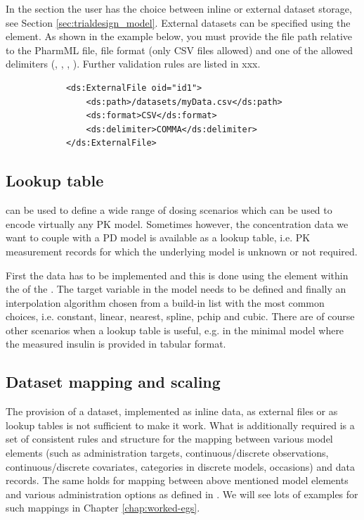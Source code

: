 In the  section the user has the choice between inline or
external dataset storage, see Section \ref{sec:trialdesign_model}.
External datasets can be specified using the  element. 
As shown in the example below, you must provide the file path relative to the PharmML file, 
file format (only CSV files allowed) and one of the allowed delimiters (, 
, , ). Further validation rules are listed in xxx.

\lstset{language=XML}
\begin{lstlisting}
            <ds:ExternalFile oid="id1">
                <ds:path>/datasets/myData.csv</ds:path>
                <ds:format>CSV</ds:format>
                <ds:delimiter>COMMA</ds:delimiter>
            </ds:ExternalFile>
\end{lstlisting}



\subsection{Lookup table}
\label{subsec:lookupTable}

 can be used to define a wide range of dosing scenarios 
which can be used to encode virtually any PK model. Sometimes however, 
the concentration data we want to couple with a PD model is available as a 
lookup table, i.e. PK measurement records for which the underlying model 
is unknown or not required.

First the data has to be implemented and this is done using the 
element within the  of the . The target variable 
in the model needs to be defined and finally an interpolation algorithm chosen 
from a build-in list with the most common choices, i.e. constant, linear, nearest, 
spline, pchip and cubic. There are of course other scenarios when a lookup table is 
useful, e.g. in the minimal model where the measured insulin is provided in tabular
format.


\subsection{Dataset mapping and scaling}
\label{subsec:lookupTable}

The provision of a dataset, implemented as inline data, as external files or 
as lookup tables is not sufficient to make it work. What is additionally required 
is a set of consistent rules and structure for the mapping between 
various model elements (such as administration targets, continuous/discrete 
observations, continuous/discrete covariates, categories in discrete models, 
occasions) and data records. The same holds for mapping between above 
mentioned model elements and various administration options as defined 
in . We will see lots of examples for such mappings in 
Chapter \ref{chap:worked-egs}.

